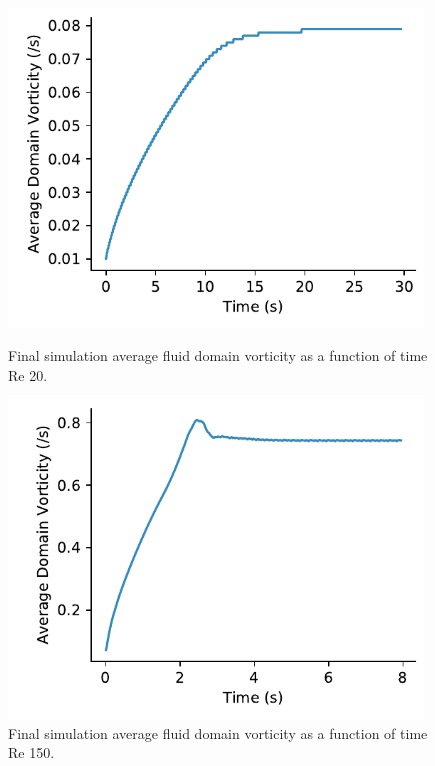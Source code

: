\documentclass[10pt,english]{article}
\begin{document}
\begin{figure}[h]
\centering
\begin{minipage}{.49\textwidth}
  \centering
\includegraphics[trim={0.0cm 0cm 0.0cm 0cm},clip,width=0.98\textwidth]{Ave_20}
\caption{Final simulation average fluid domain vorticity as a function of time Re 20.}
\label{f:Ave_20}
\end{minipage}%
\hspace{5pt}
\begin{minipage}{.49\textwidth}
  \centering
\includegraphics[trim={0.0cm 0cm 0.0cm 0cm},clip,width=0.98\textwidth]{Ave_150}
\caption{\vspace{0pt}Final simulation average fluid domain vorticity as a function of time Re 150.}
\label{f:Ave_150}
\end{minipage}
\end{figure}
\end{document}
